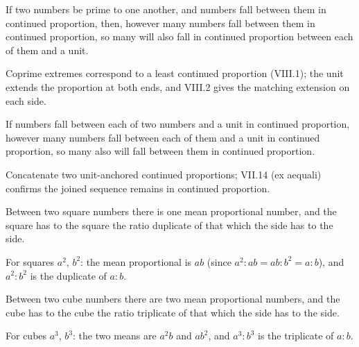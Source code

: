 \documentclass{rrxiv}
\begin{document}
\begin{claim}
\label{prop:VIII.9}
If two numbers be prime to one another, and numbers fall between them
in continued proportion, then, however many numbers fall between them
in continued proportion, so many will also fall in continued
proportion between each of them and a unit.
\end{claim}
\begin{evidence}
\label{ev:VIII.9}
Coprime extremes correspond to a least continued proportion (VIII.1);
the unit extends the proportion at both ends, and VIII.2 gives the
matching extension on each side.
\end{evidence}

\begin{claim}
\label{prop:VIII.10}
If numbers fall between each of two numbers and a unit in continued
proportion, however many numbers fall between each of them and a
unit in continued proportion, so many also will fall between them in
continued proportion.
\end{claim}
\begin{evidence}
\label{ev:VIII.10}
Concatenate two unit-anchored continued proportions; VII.14 (ex
aequali) confirms the joined sequence remains in continued
proportion.
\end{evidence}

\begin{claim}
\label{prop:VIII.11}
Between two square numbers there is one mean proportional number, and
the square has to the square the ratio duplicate of that which the
side has to the side.
\end{claim}
\begin{evidence}
\label{ev:VIII.11}
For squares $a^2$, $b^2$: the mean proportional is $ab$ (since $a^2 :
ab = ab : b^2 = a : b$), and $a^2 : b^2$ is the duplicate of $a : b$.
\end{evidence}

\begin{claim}
\label{prop:VIII.12}
Between two cube numbers there are two mean proportional numbers,
and the cube has to the cube the ratio triplicate of that which the
side has to the side.
\end{claim}
\begin{evidence}
\label{ev:VIII.12}
For cubes $a^3$, $b^3$: the two means are $a^2 b$ and $a b^2$, and
$a^3 : b^3$ is the triplicate of $a : b$.
\end{evidence}
\end{document}
